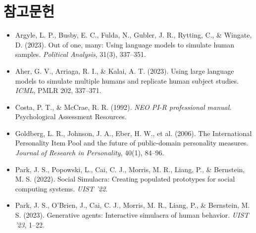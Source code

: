 \documentclass[11pt, a4paper]{article}
\begin{document}
\section*{참고문헌}
\small
\begin{itemize}
  \item Argyle, L. P., Busby, E. C., Fulda, N., Gubler, J. R., Rytting, C., \& Wingate, D. (2023). Out of one, many: Using language models to simulate human samples. \textit{Political Analysis}, 31(3), 337--351.
  \item Aher, G. V., Arriaga, R. I., \& Kalai, A. T. (2023). Using large language models to simulate multiple humans and replicate human subject studies. \textit{ICML}, PMLR 202, 337--371.
  \item Costa, P. T., \& McCrae, R. R. (1992). \textit{NEO PI-R professional manual}. Psychological Assessment Resources.
  \item Goldberg, L. R., Johnson, J. A., Eber, H. W., et al. (2006). The International Personality Item Pool and the future of public-domain personality measures. \textit{Journal of Research in Personality}, 40(1), 84--96.
  \item Park, J. S., Popowski, L., Cai, C. J., Morris, M. R., Liang, P., \& Bernstein, M. S. (2022). Social Simulacra: Creating populated prototypes for social computing systems. \textit{UIST '22}.
  \item Park, J. S., O'Brien, J., Cai, C. J., Morris, M. R., Liang, P., \& Bernstein, M. S. (2023). Generative agents: Interactive simulacra of human behavior. \textit{UIST '23}, 1--22.
\end{itemize}
\end{document}
